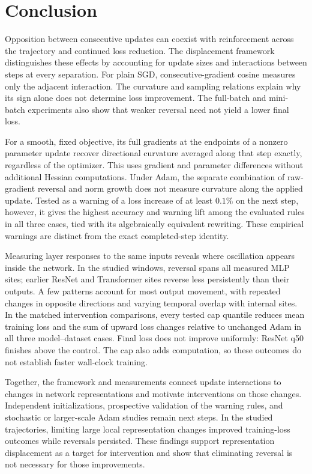 \section{Conclusion}
\label{sec:conclusion}

Opposition between consecutive updates can coexist with reinforcement
across the trajectory and continued loss reduction. The displacement
framework distinguishes these effects by accounting for update sizes
and interactions between steps at every separation. For plain SGD,
consecutive-gradient cosine measures only the adjacent interaction.
The curvature and sampling relations explain why its sign alone does
not determine loss improvement. The full-batch and mini-batch experiments
also show that weaker reversal need not yield a lower final loss.

For a smooth, fixed objective, its full gradients at the endpoints of
a nonzero parameter update recover directional curvature averaged along
that step exactly, regardless of the optimizer. This uses gradient and
parameter differences without additional Hessian computations. Under
Adam, the separate combination of raw-gradient reversal and norm growth
does not measure curvature along the applied update. Tested as a warning
of a loss increase of at least $0.1\%$ on the next step, however, it gives
the highest accuracy and warning lift among the evaluated rules in all
three cases, tied with its algebraically equivalent rewriting. These
empirical warnings are distinct from the exact completed-step identity.

Measuring layer responses to the same inputs reveals where oscillation
appears inside the network. In the studied windows, reversal spans all
measured MLP sites; earlier ResNet and Transformer sites reverse less
persistently than their outputs. A few patterns account for most output
movement, with repeated changes in opposite directions and varying
temporal overlap with internal sites. In the matched intervention
comparisons, every tested cap quantile reduces mean training loss and
the sum of upward loss changes relative to unchanged Adam in all three
model--dataset cases. Final loss does not improve uniformly: ResNet q50
finishes above the control. The cap also adds computation, so these
outcomes do not establish faster wall-clock training.

Together, the framework and measurements connect update interactions
to changes in network representations and motivate interventions on
those changes. Independent initializations, prospective validation of
the warning rules, and stochastic or larger-scale Adam studies remain
next steps. In the studied trajectories, limiting large local
representation changes improved training-loss outcomes while reversals
persisted. These findings support representation displacement as a
target for intervention and show that eliminating reversal is not
necessary for those improvements.
